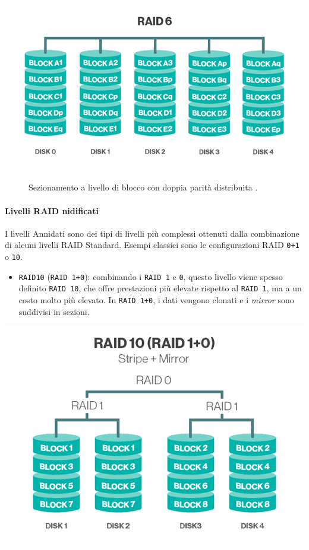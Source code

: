 \begin{itemize}
\begin{center}
\includegraphics[scale=0.55]{img/raid66.png}
\end{center}

\begin{figure}[htbp]
\caption{Sezionamento a livello di blocco con doppia parit\`{a} distribuita \cite{etichetta9}.}
\label{fig:raid66} 
\end{figure}
\end{itemize}


\paragraph{Livelli RAID nidificati}

I livelli Annidati sono dei tipi di livelli pi\`{u} complessi ottenuti dalla combinazione di alcuni livelli RAID Standard. Esempi classici sono le configurazioni RAID \verb"0+1" o \verb"10".

\begin{itemize}
\item 
\verb"RAID10" (\verb"RAID 1+0"): combinando i \verb"RAID 1" e \verb"0", questo livello viene spesso definito \verb"RAID 10", che offre prestazioni pi\`{u} elevate rispetto al \verb"RAID 1", ma a un costo molto pi\`{u} elevato. In \verb"RAID 1+0", i dati vengono clonati e i \textit{mirror} sono suddivisi in sezioni\cite{etichetta9}.
\end{itemize}

\begin{center}
\includegraphics[scale=0.50]{img/raid10.png}
\end{center}

